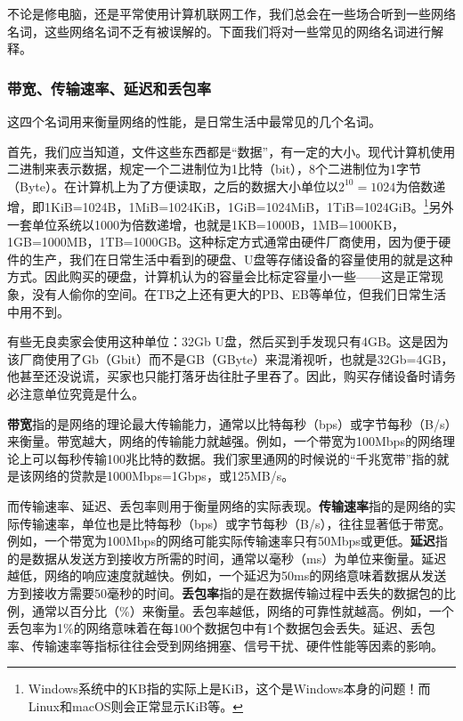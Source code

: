 不论是修电脑，还是平常使用计算机联网工作，我们总会在一些场合听到一些网络名词，这些网络名词不乏有被误解的。下面我们将对一些常见的网络名词进行解释。

\subsubsection{带宽、传输速率、延迟和丢包率}

这四个名词用来衡量网络的性能，是日常生活中最常见的几个名词。

首先，我们应当知道，文件这些东西都是“数据”，有一定的大小。现代计算机使用二进制来表示数据，规定一个二进制位为1比特（bit），8个二进制位为1字节（Byte）。在计算机上为了方便读取，之后的数据大小单位以$2^10=1024$为倍数递增，即1KiB=1024B，1MiB=1024KiB，1GiB=1024MiB，1TiB=1024GiB。\footnote{Windows系统中的KB指的实际上是KiB，这个是Windows本身的问题！而Linux和macOS则会正常显示KiB等。}另外一套单位系统以1000为倍数递增，也就是1KB=1000B，1MB=1000KB，1GB=1000MB，1TB=1000GB。这种标定方式通常由硬件厂商使用，因为便于硬件的生产，我们在日常生活中看到的硬盘、U盘等存储设备的容量使用的就是这种方式。因此购买的硬盘，计算机认为的容量会比标定容量小一些——这是正常现象，没有人偷你的空间。在TB之上还有更大的PB、EB等单位，但我们日常生活中用不到。

\begin{caution}
  有些无良卖家会使用这种单位：32Gb U盘，然后买到手发现只有4GB。这是因为该厂商使用了Gb（Gbit）而不是GB（GByte）来混淆视听，也就是32Gb=4GB，他甚至还没说谎，买家也只能打落牙齿往肚子里吞了。因此，购买存储设备时请务必注意单位究竟是什么。
\end{caution}

\textbf{带宽}指的是网络的理论最大传输能力，通常以比特每秒（bps）或字节每秒（B/s）来衡量。带宽越大，网络的传输能力就越强。例如，一个带宽为100Mbps的网络理论上可以每秒传输100兆比特的数据。我们家里通网的时候说的“千兆宽带”指的就是该网络的贷款是1000Mbps=1Gbps，或125MB/s。

而传输速率、延迟、丢包率则用于衡量网络的实际表现。\textbf{传输速率}指的是网络的实际传输速率，单位也是比特每秒（bps）或字节每秒（B/s），往往显著低于带宽。例如，一个带宽为100Mbps的网络可能实际传输速率只有50Mbps或更低。\textbf{延迟}指的是数据从发送方到接收方所需的时间，通常以毫秒（ms）为单位来衡量。延迟越低，网络的响应速度就越快。例如，一个延迟为50ms的网络意味着数据从发送方到接收方需要50毫秒的时间。\textbf{丢包率}指的是在数据传输过程中丢失的数据包的比例，通常以百分比（\%）来衡量。丢包率越低，网络的可靠性就越高。例如，一个丢包率为1\%的网络意味着在每100个数据包中有1个数据包会丢失。延迟、丢包率、传输速率等指标往往会受到网络拥塞、信号干扰、硬件性能等因素的影响。

